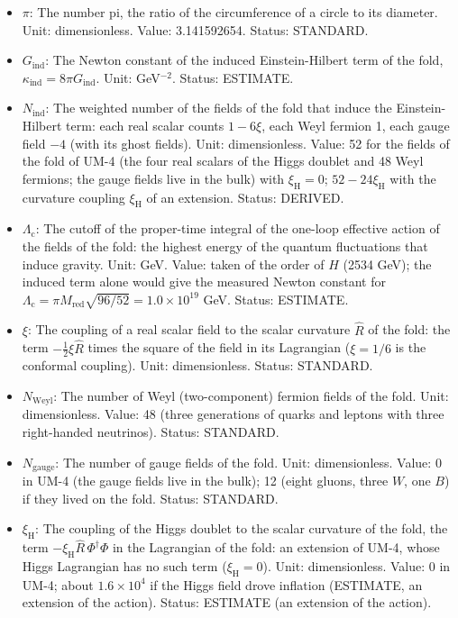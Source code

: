 \documentclass[
  10pt,
]{article}
\providecommand{\tightlist}{%
  \setlength{\itemsep}{0pt}\setlength{\parskip}{0pt}}
\begin{document}
\begin{itemize}
\tightlist
\item
  \(\pi\): The number pi, the ratio of the circumference of a circle to
  its diameter. Unit: dimensionless. Value: 3.141592654. Status:
  STANDARD.
\item
  \(G_{\mathrm{ind}}\): The Newton constant of the induced
  Einstein-Hilbert term of the fold,
  \(\kappa_{\mathrm{ind}} = 8\pi G_{\mathrm{ind}}\). Unit: GeV\(^{-2}\).
  Status: ESTIMATE.
\item
  \(N_{\mathrm{ind}}\): The weighted number of the fields of the fold
  that induce the Einstein-Hilbert term: each real scalar counts
  \(1 - 6\xi\), each Weyl fermion 1, each gauge field \(-4\) (with its
  ghost fields). Unit: dimensionless. Value: 52 for the fields of the
  fold of UM-4 (the four real scalars of the Higgs doublet and 48 Weyl
  fermions; the gauge fields live in the bulk) with
  \(\xi_{\mathrm{H}} = 0\); \(52 - 24\xi_{\mathrm{H}}\) with the
  curvature coupling \(\xi_{\mathrm{H}}\) of an extension. Status:
  DERIVED.
\item
  \(\Lambda_{\mathrm{c}}\): The cutoff of the proper-time integral of
  the one-loop effective action of the fields of the fold: the highest
  energy of the quantum fluctuations that induce gravity. Unit: GeV.
  Value: taken of the order of \(H\) (2534 GeV); the induced term alone
  would give the measured Newton constant for
  \(\Lambda_{\mathrm{c}} = \pi M_{\mathrm{red}}\sqrt{96/52} = 1.0\times10^{19}\)
  GeV. Status: ESTIMATE.
\item
  \(\xi\): The coupling of a real scalar field to the scalar curvature
  \(\hat R\) of the fold: the term \(-\frac12\xi\hat R\) times the
  square of the field in its Lagrangian (\(\xi = 1/6\) is the conformal
  coupling). Unit: dimensionless. Status: STANDARD.
\item
  \(N_{\mathrm{Weyl}}\): The number of Weyl (two-component) fermion
  fields of the fold. Unit: dimensionless. Value: 48 (three generations
  of quarks and leptons with three right-handed neutrinos). Status:
  STANDARD.
\item
  \(N_{\mathrm{gauge}}\): The number of gauge fields of the fold. Unit:
  dimensionless. Value: 0 in UM-4 (the gauge fields live in the bulk);
  12 (eight gluons, three \(W\), one \(B\)) if they lived on the fold.
  Status: STANDARD.
\item
  \(\xi_{\mathrm{H}}\): The coupling of the Higgs doublet to the scalar
  curvature of the fold, the term
  \(-\xi_{\mathrm{H}}\hat R\,\Phi^\dagger\Phi\) in the Lagrangian of the
  fold: an extension of UM-4, whose Higgs Lagrangian has no such term
  (\(\xi_{\mathrm{H}} = 0\)). Unit: dimensionless. Value: 0 in UM-4;
  about \(1.6\times10^4\) if the Higgs field drove inflation (ESTIMATE,
  an extension of the action). Status: ESTIMATE (an extension of the
  action).
\end{itemize}
\end{document}
